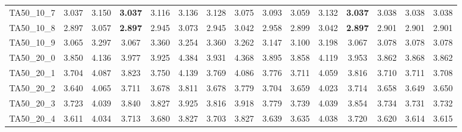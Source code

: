 \begin{tabular}{cc||ccccccccccccc}
TA50\_10\_7        & 3.037            & 3.150            & {\bf 3.037}      & 3.116            & 3.136            & 3.128            & 3.075            & 3.093            & 3.059            & 3.132            & {\bf 3.037}      & 3.038            & 3.038            & 3.038           \\ 
TA50\_10\_8        & 2.897            & 3.057            & {\bf 2.897}      & 2.945            & 3.073            & 2.945            & 3.042            & 2.958            & 2.899            & 3.042            & {\bf 2.897}      & 2.901            & 2.901            & 2.901           \\ 
TA50\_10\_9        & 3.065            & 3.297            & 3.067            & 3.360            & 3.254            & 3.360            & 3.262            & 3.147            & 3.100            & 3.198            & 3.067            & 3.078            & 3.078            & 3.078           \\ 
TA50\_20\_0        & 3.850            & 4.136            & 3.977            & 3.925            & 4.384            & 3.931            & 4.368            & 3.895            & 3.858            & 4.119            & 3.953            & 3.862            & 3.868            & 3.862           \\ 
TA50\_20\_1        & 3.704            & 4.087            & 3.823            & 3.750            & 4.139            & 3.769            & 4.086            & 3.776            & 3.711            & 4.059            & 3.816            & 3.710            & 3.711            & 3.708           \\ 
TA50\_20\_2        & 3.640            & 4.065            & 3.711            & 3.678            & 3.811            & 3.678            & 3.779            & 3.704            & 3.659            & 4.023            & 3.714            & 3.658            & 3.649            & 3.650           \\ 
TA50\_20\_3        & 3.723            & 4.039            & 3.840            & 3.827            & 3.925            & 3.816            & 3.918            & 3.779            & 3.739            & 4.039            & 3.854            & 3.734            & 3.731            & 3.732           \\ 
TA50\_20\_4        & 3.611            & 4.034            & 3.713            & 3.680            & 3.827            & 3.703            & 3.827            & 3.639            & 3.635            & 4.038            & 3.720            & 3.620            & 3.614            & 3.615           \\ 

\end{tabular}
